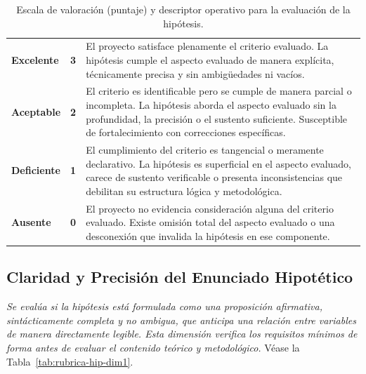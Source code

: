 \begin{table}[htbp]
\centering
\scriptsize
\caption{Escala de valoración (puntaje) y descriptor operativo para la evaluación de la hipótesis.}
\label{tab:escala-hipotesis}
\begin{tabularx}{\textwidth}{|C{2.8cm}|C{1cm}|X|}
\hline
{}
 &  &  \\ \hline
\textcolor{csuf}{\textbf{Excelente}} & \textbf{3} & El proyecto satisface plenamente el criterio evaluado. La hipótesis cumple el aspecto evaluado de manera explícita, técnicamente precisa y sin ambigüedades ni vacíos. \\ \hline
{}
\textcolor{cace}{\textbf{Aceptable}} & \textbf{2} & El criterio es identificable pero se cumple de manera parcial o incompleta. La hipótesis aborda el aspecto evaluado sin la profundidad, la precisión o el sustento suficiente. Susceptible de fortalecimiento con correcciones específicas. \\ \hline
\textcolor{cdef}{\textbf{Deficiente}} & \textbf{1} & El cumplimiento del criterio es tangencial o meramente declarativo. La hipótesis es superficial en el aspecto evaluado, carece de sustento verificable o presenta inconsistencias que debilitan su estructura lógica y metodológica. \\ \hline
{}
\textcolor{cins}{\textbf{Ausente}} & \textbf{0} & El proyecto no evidencia consideración alguna del criterio evaluado. Existe omisión total del aspecto evaluado o una desconexión que invalida la hipótesis en ese componente. \\ \hline
\end{tabularx}
\end{table}

\clearpage
\subsection{Claridad y Precisión del Enunciado Hipotético}
\textit{Se evalúa si la hipótesis está formulada como una proposición afirmativa, sintácticamente completa y no ambigua, que anticipa una relación entre variables de manera directamente legible. Esta dimensión verifica los requisitos mínimos de forma antes de evaluar el contenido teórico y metodológico.} Véase la Tabla~\ref{tab:rubrica-hip-dim1}.

